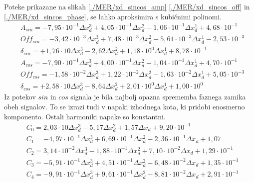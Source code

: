 Poteke prikazane na slikah \ref{./MER/xd_sincos_amp} \ref{./MER/xd_sincos_off} in \ref{./MER/xd_sincos_phase}, se lahko aproksimira s kubičnimi polinomi.
\begin{eqnarray}
&A_{sin}=-7,95\cdot10^{-1}\Delta x_d^3+4,05\cdot10^{-1}\Delta x_d^2-1,06\cdot10^{-1}\Delta x_d^1+4,68\cdot10^{-1}\\
&Off_{sin}=-3,42\cdot10^{-3}\Delta x_d^3+7,48\cdot10^{-3}\Delta x_d^2-5,61\cdot10^{-3}\Delta x_d^1-2,53\cdot10^{-3}\\
&\delta_{sin}=+1,76\cdot10\Delta x_d^3-2,62\Delta x_d^2+1,18\cdot10^{0}\Delta x_d^1+8,78\cdot10^{-1}\\
&A_{cos}=-7,90\cdot10^{-1}\Delta x_d^3+4,00\cdot10^{-1}\Delta x_d^2-1,04\cdot10^{-1}\Delta x_d^1+4,70\cdot10^{-1}\\
&Off_{cos}=-1,58\cdot10^{-2}\Delta x_d^3+1,22\cdot10^{-2}\Delta x_d^2-1,63\cdot10^{-2}\Delta x_d^1+5,05\cdot10^{-3}\\
&\delta_{cos}=+2,58\cdot10\Delta x_d^3-8,64\Delta x_d^2+2,01\cdot10^{0}\Delta x_d^1+1,00\cdot10^{0}
\end{eqnarray}
Iz potekov $sin$ in $cos$ signala je bila najbolj opazna sprememba faznega zamika obeh signalov. To se izrazi tudi v napaki izhodnega kota, ki pridobi enosmerno komponento. Ostali harmoniki napake so konstantni.
\begin{eqnarray}
&C_0 =2,03\cdot 10\Delta x_d^{3}-5,17\Delta x_d^{2}+1,57\Delta x_d+9,20\cdot 10^{-1} \\                                
&C_1 =-4,97\cdot 10^{-1}\Delta x_d^{3}+6,69\cdot 10^{-1}\Delta x_d^{2}-2,36\cdot 10^{-1}\Delta x_d+1,07 \\             
&C_2 =3,14\cdot 10^{-2}\Delta x_d^{3}-1,88\cdot 10^{-1}\Delta x_d^{2}+7,10\cdot 10^{-2}\Delta x_d+1,29\cdot 10^{-1} \\ 
&C_3 =-5,91\cdot 10^{-1}\Delta x_d^{3}+4,51\cdot 10^{-1}\Delta x_d^{2}-6,48\cdot 10^{-2}\Delta x_d+1,35\cdot 10^{-1} \\
&C_4 =-9,91\cdot 10^{-1}\Delta x_d^{3}+9,61\cdot 10^{-1}\Delta x_d^{2}-8,81\cdot 10^{-2}\Delta x_d+2,91\cdot 10^{-1} 
\end{eqnarray}




